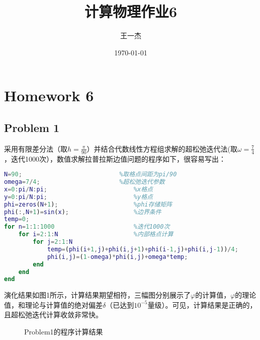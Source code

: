 \documentclass{article}
\title{计算物理作业6} %
\author[a]{王一杰} %
\affil[a]{中国科学技术大学}
\date{\today}%
\begin{document}
\maketitle

\section{Homework 6}
\subsection{Problem 1}

采用有限差分法（取$h=\frac{\pi}{90}$）并结合代数线性方程组求解的超松弛迭代法(取$\omega=\frac{7}{4}$，迭代1000次），数值求解拉普拉斯边值问题的程序如下，很容易写出：
\begin{lstlisting}[language=MATLAB]
N=90;							%取格点间距为pi/90
omega=7/4;						%超松弛迭代参数
x=0:pi/N:pi;						%x格点
y=0:pi/N:pi;						%y格点
phi=zeros(N+1);						%phi存储矩阵
phi(:,N+1)=sin(x);					%边界条件
temp=0;
for n=1:1:1000						%迭代1000次
    for i=2:1:N						%内部格点计算
        for j=2:1:N
            temp=(phi(i+1,j)+phi(i,j+1)+phi(i-1,j)+phi(i,j-1))/4;
            phi(i,j)=(1-omega)*phi(i,j)+omega*temp;
        end
    end
end
\end{lstlisting}

演化结果如图1所示，计算结果期望相符，三幅图分别展示了$\varphi$的计算值，$\varphi$的理论值，和理论与计算值的绝对偏差$\delta$（已达到$10^{-5}$量级）。可见，计算结果是正确的，且超松弛迭代计算收敛非常快。





\begin{figure}[tbp]
 \caption{Problem1的程序计算结果}
\end{figure}
\end{document}
